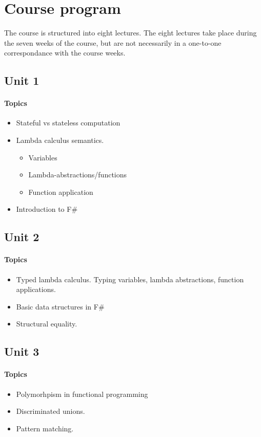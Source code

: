 \section{Course program}
The course is structured into eight lectures.
The eight lectures take place during the seven weeks of the course, but are not necessarily in a one-to-one correspondance with the course weeks.

\subsection*{Unit 1}
\paragraph*{Topics}
\begin{itemize}[noitemsep]
	\item Stateful vs stateless computation
  \item Lambda calculus semantics.
    \begin{itemize}[noitemsep]
      \item Variables
      \item Lambda-abstractions/functions
      \item Function application
    \end{itemize}	
  \item Introduction to F\#
\end{itemize}

\subsection*{Unit 2}
\paragraph*{Topics}			
\begin{itemize}[noitemsep]
	\item Typed lambda calculus. Typing variables, lambda abstractions, function applications.
  \item Basic data structures in F\#
  \item Structural equality.
\end{itemize}

\subsection*{Unit 3}
\paragraph*{Topics}			
\begin{itemize}[noitemsep]
  \item Polymorhpism in functional programming
	\item Discriminated unions.
  \item Pattern matching.
\end{itemize}

